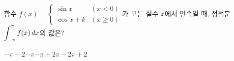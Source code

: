 함수 $f(x)=\begin{cases} \sin x & (x<0) \\ \cos x+k & (x\ge 0) \end{cases}$가 모든 실수 $x$에서 연속일 때, 정적분 $\displaystyle\int_{-\pi}^{\pi}f(x)\mkern3mu dx$의 값은? 
\begin{choices32}{$-\pi-2$}{$-\pi$}{$-\pi+2$}{$\pi-2$}{$\pi+2$}\end{choices32}
